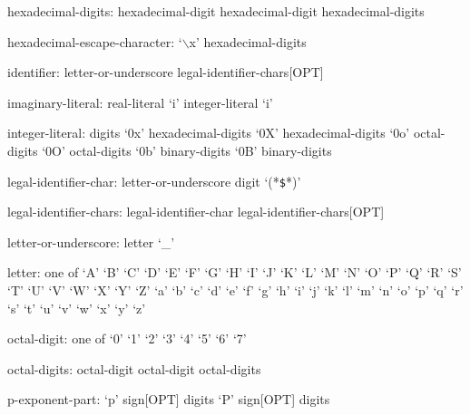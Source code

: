 \begin{syntax}
hexadecimal-digits:
  hexadecimal-digit
  hexadecimal-digit hexadecimal-digits
\end{syntax}

\begin{syntax}
hexadecimal-escape-character:
  `$\backslash$x' hexadecimal-digits
\end{syntax}

\begin{syntax}
identifier:
  letter-or-underscore legal-identifier-chars[OPT]
\end{syntax}

\begin{syntax}
imaginary-literal:
  real-literal `i'
  integer-literal `i'
\end{syntax}

\begin{syntax}
integer-literal:
  digits
  `0x' hexadecimal-digits
  `0X' hexadecimal-digits
  `0o' octal-digits
  `0O' octal-digits
  `0b' binary-digits
  `0B' binary-digits
\end{syntax}

\begin{syntax}
legal-identifier-char:
  letter-or-underscore
  digit
  `(*\texttt{\$}*)'
\end{syntax}

\begin{syntax}
legal-identifier-chars:
  legal-identifier-char legal-identifier-chars[OPT]
\end{syntax}

\begin{syntax}
letter-or-underscore:
  letter
  `_'
\end{syntax}

\begin{syntax}
letter: one of
  `A' `B' `C' `D' `E' `F' `G' `H' `I' `J' `K' `L' `M' `N' `O' `P' `Q' `R' `S' `T' `U' `V' `W' `X' `Y' `Z'
  `a' `b' `c' `d' `e' `f' `g' `h' `i' `j' `k' `l' `m' `n' `o' `p' `q' `r' `s' `t' `u' `v' `w' `x' `y' `z'
\end{syntax}

\begin{syntax}
octal-digit: one of
  `0' `1' `2' `3' `4' `5' `6' `7'
\end{syntax}

\begin{syntax}
octal-digits:
  octal-digit
  octal-digit octal-digits
\end{syntax}

\begin{syntax}
p-exponent-part:
  `p' sign[OPT] digits
  `P' sign[OPT] digits
\end{syntax}

